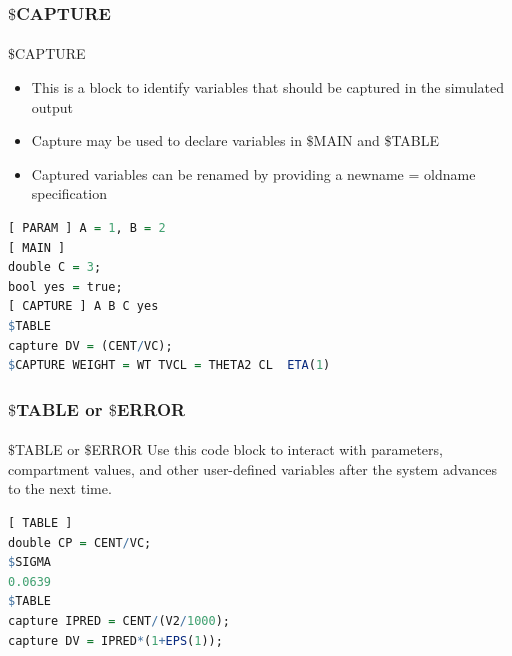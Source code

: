 \documentclass[
	11pt, %
]{beamer}
\begin{document}


\begin{frame}[fragile]
	\frametitle{$\$$CAPTURE}
	\framesubtitle{} %
	\begin{block}{$\$$CAPTURE}
	\tiny
	\begin{itemize}
\item This is a block to identify variables that should be captured in the simulated output
\item Capture may be used to declare variables in $\$$MAIN and $\$$TABLE
\item Captured variables can be renamed by providing a newname = oldname specification
\end{itemize}
\begin{lstlisting}[language=R]
[ PARAM ] A = 1, B = 2
[ MAIN ]
double C = 3;
bool yes = true;
[ CAPTURE ] A B C yes
$TABLE
capture DV = (CENT/VC);
$CAPTURE WEIGHT = WT TVCL = THETA2 CL  ETA(1)
\end{lstlisting}
	\end{block}

\end{frame}



\begin{frame}[fragile]
	\frametitle{$\$$TABLE or $\$$ERROR}
	\framesubtitle{} %
	\begin{block}{$\$$TABLE or $\$$ERROR}
	\small
Use this code block to interact with parameters, compartment values, and other user-defined variables after the system advances to the next time.
\begin{lstlisting}[language=R]
[ TABLE ]
double CP = CENT/VC;
$SIGMA 
0.0639
$TABLE
capture IPRED = CENT/(V2/1000);
capture DV = IPRED*(1+EPS(1));
\end{lstlisting}
	\end{block}

\end{frame}


\end{document}
